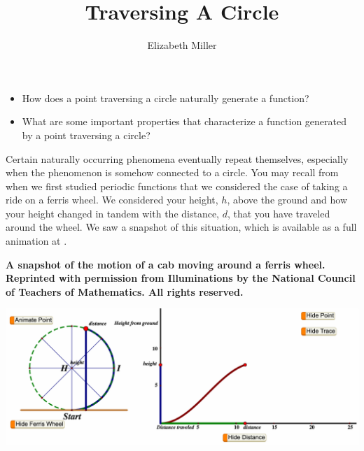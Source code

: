 \documentclass[nooutcomes, noauthor]{ximera}
\author{Elizabeth Miller}
\title{Traversing A Circle}
\begin{document}
\licenseAPC
\begin{abstract}
  
\end{abstract}
\maketitle



\begin{motivatingQuestions}\begin{itemize}
\item How does a point traversing a circle naturally generate a function?
\item What are some important properties that characterize a function generated by a point traversing a circle?
\end{itemize}\end{motivatingQuestions}



Certain naturally occurring phenomena eventually repeat themselves, especially when the phenomenon is somehow connected to a circle. You may recall from when we first studied periodic functions that we considered the case of taking a ride on a ferris wheel.  We considered your height, \(h\), above the ground and how your height changed in tandem with the distance, \(d\), that you have traveled around the wheel.  We saw a snapshot of this situation, which is available as a full animation at .%

\begin{center}
\textbf{A snapshot of the motion of a cab moving around a ferris wheel.  Reprinted with permission from Illuminations by the National Council of Teachers of Mathematics. All rights reserved.}
\end{center}
\begin{image}
\includegraphics[width=\textwidth]{traversing-ferris-wheel-animation.png}
\end{image}
\end{document}
